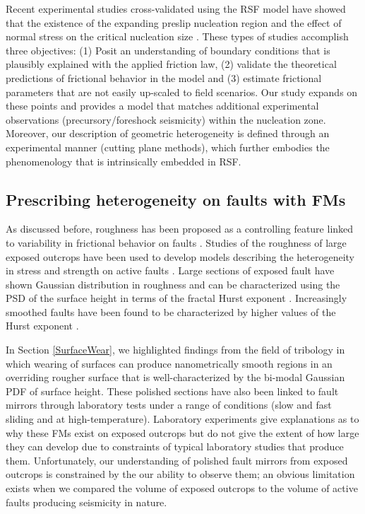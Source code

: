 \documentclass[preprint,1p, 10pt,authoryear]{elsarticle}
\begin{document}
Recent experimental studies cross-validated using the RSF model have showed that the existence of the expanding preslip nucleation region  \citep{Nielsen2010,Kaneko2011} and the effect of normal stress on the critical nucleation size \citep{Latour2013,Kaneko2016}. These types of studies accomplish three objectives: (1) Posit an understanding of boundary conditions that is plausibly explained with the applied friction law, (2) validate the theoretical predictions of frictional behavior in the model \citep{Ruina1983,Rubin2005,Ampuero2008} and (3) estimate frictional parameters that are not easily up-scaled to field scenarios. Our study expands on these points and provides a model that matches additional experimental observations (precursory/foreshock seismicity) within the nucleation zone. Moreover, our description of geometric heterogeneity is defined through an experimental manner (cutting plane methods), which further embodies the phenomenology that is intrinsically embedded in RSF.

\subsection{Prescribing heterogeneity on faults with FMs }
As discussed before, roughness has been proposed as a controlling feature linked to variability in frictional behavior on faults \citep{Scholz1986,Scholz2002}. Studies of the roughness of large exposed outcrops have been used to develop models describing the heterogeneity in stress and strength on active faults \citep[e.g.,][]{Schmittbuhl2006}. Large sections of exposed fault have shown Gaussian distribution in roughness \citep[e.g.,][]{Renard2006} and can be characterized using the PSD of the surface height in terms of the fractal Hurst exponent \citep{Power1991, Schmittbuhl1995, Candela2009}. Increasingly smoothed faults have been found to be characterized by higher values of the Hurst exponent \citep{Brodsky2011, Siman-Tov2013, Kirkpatrick2014, Candela2016, Brodsky2016}. 

In Section \ref{SurfaceWear}, we highlighted findings from the field of tribology in which wearing of surfaces can produce nanometrically smooth regions in an overriding rougher surface that is well-characterized by the bi-modal Gaussian PDF of surface height. These polished sections have also been linked to fault mirrors through laboratory tests under a range of conditions (slow and fast sliding and at high-temperature).  Laboratory experiments give explanations as to why these FMs exist on exposed outcrops but do not give the extent of how large they can develop due to constraints of typical laboratory studies that produce them. Unfortunately, our understanding of polished fault mirrors from exposed outcrops is constrained by the our ability to observe them; an obvious limitation exists when we compared the volume of exposed outcrops to the volume of active faults producing seismicity in nature.  
\end{document}
